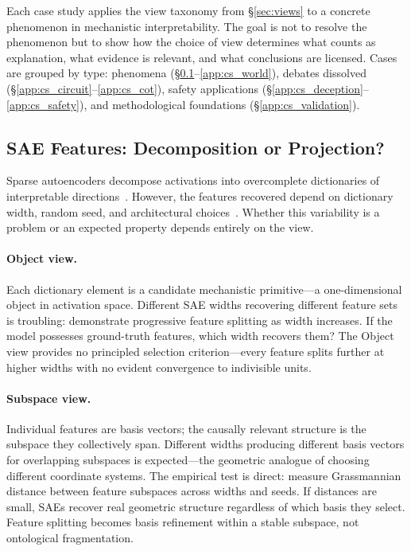 \documentclass{article}
\begin{document}
Each case study applies the view taxonomy from \S\ref{sec:views} to a
concrete phenomenon in mechanistic interpretability. The goal is not to
resolve the phenomenon but to show how the choice of view determines what
counts as explanation, what evidence is relevant, and what conclusions
are licensed. Cases are grouped by type: phenomena
(\S\ref{app:cs_sae}--\ref{app:cs_world}), debates dissolved
(\S\ref{app:cs_circuit}--\ref{app:cs_cot}), safety applications
(\S\ref{app:cs_deception}--\ref{app:cs_safety}), and methodological
foundations (\S\ref{app:cs_validation}).


\subsection{SAE Features: Decomposition or Projection?}\label{app:cs_sae}

Sparse autoencoders decompose activations into overcomplete dictionaries
of interpretable directions~\citep{bricken2023}. However, the features
recovered depend on dictionary width, random seed, and architectural
choices~\citep{leask2025}. Whether this variability is a problem or an
expected property depends entirely on the view.

\paragraph{Object view.}
Each dictionary element is a candidate mechanistic primitive---a
one-dimensional object in activation space. Different SAE widths
recovering different feature sets is troubling: \citet{bricken2023}
demonstrate progressive feature splitting as width increases. If the
model possesses ground-truth features, which width recovers them? The
Object view provides no principled selection criterion---every feature
splits further at higher widths with no evident convergence to
indivisible units.

\paragraph{Subspace view.}
Individual features are basis vectors; the causally relevant structure is
the subspace they collectively span. Different widths producing different
basis vectors for overlapping subspaces is expected---the geometric
analogue of choosing different coordinate systems. The empirical test is
direct: measure Grassmannian distance between feature subspaces across
widths and seeds. If distances are small, SAEs recover real geometric
structure regardless of which basis they select. Feature splitting
becomes basis refinement within a stable subspace, not ontological
fragmentation.
\end{document}
